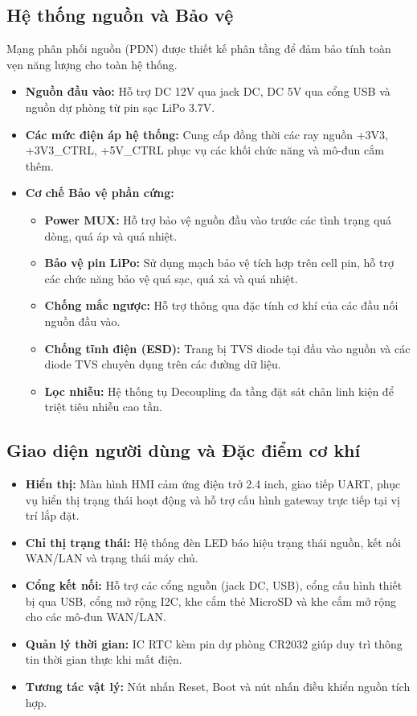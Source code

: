     \subsection{Hệ thống nguồn và Bảo vệ}
        Mạng phân phối nguồn (PDN) được thiết kế phân tầng để đảm bảo tính toàn vẹn năng lượng cho toàn hệ thống.
        \begin{itemize}
            \item \textbf{Nguồn đầu vào:} Hỗ trợ DC 12V qua jack DC, DC 5V qua cổng USB và nguồn dự phòng từ pin sạc LiPo 3.7V.
            \item \textbf{Các mức điện áp hệ thống:} Cung cấp đồng thời các ray nguồn +3V3, +3V3\_CTRL, +5V\_CTRL phục vụ các khối chức năng và mô-đun cắm thêm.
            \item \textbf{Cơ chế Bảo vệ phần cứng:}
            \begin{itemize}
                \item \textbf{Power MUX:} Hỗ trợ bảo vệ nguồn đầu vào trước các tình trạng quá dòng, quá áp và quá nhiệt.
                \item \textbf{Bảo vệ pin LiPo:} Sử dụng mạch bảo vệ tích hợp trên cell pin, hỗ trợ các chức năng bảo vệ quá sạc, quá xả và quá nhiệt.
                \item \textbf{Chống mắc ngược:} Hỗ trợ thông qua đặc tính cơ khí của các đầu nối nguồn đầu vào.
                \item \textbf{Chống tĩnh điện (ESD):} Trang bị TVS diode tại đầu vào nguồn và các diode TVS chuyên dụng trên các đường dữ liệu.
                \item \textbf{Lọc nhiễu:} Hệ thống tụ Decoupling đa tầng đặt sát chân linh kiện để triệt tiêu nhiễu cao tần.
            \end{itemize}
        \end{itemize}

    \subsection{Giao diện người dùng và Đặc điểm cơ khí}
        \begin{itemize}
            \item \textbf{Hiển thị:} Màn hình HMI cảm ứng điện trở 2.4 inch, giao tiếp UART, phục vụ hiển thị trạng thái hoạt động và hỗ trợ cấu hình gateway trực tiếp tại vị trí lắp đặt.
            \item \textbf{Chỉ thị trạng thái:} Hệ thống đèn LED báo hiệu trạng thái nguồn, kết nối WAN/LAN và trạng thái máy chủ.
            \item \textbf{Cổng kết nối:} Hỗ trợ các cổng nguồn (jack DC, USB), cổng cấu hình thiết bị qua USB, cổng mở rộng I2C, khe cắm thẻ MicroSD và khe cắm mở rộng cho các mô-đun WAN/LAN.
            \item \textbf{Quản lý thời gian:} IC RTC kèm pin dự phòng CR2032 giúp duy trì thông tin thời gian thực khi mất điện.
            \item \textbf{Tương tác vật lý:} Nút nhấn Reset, Boot và nút nhấn điều khiển nguồn tích hợp.
        \end{itemize}

